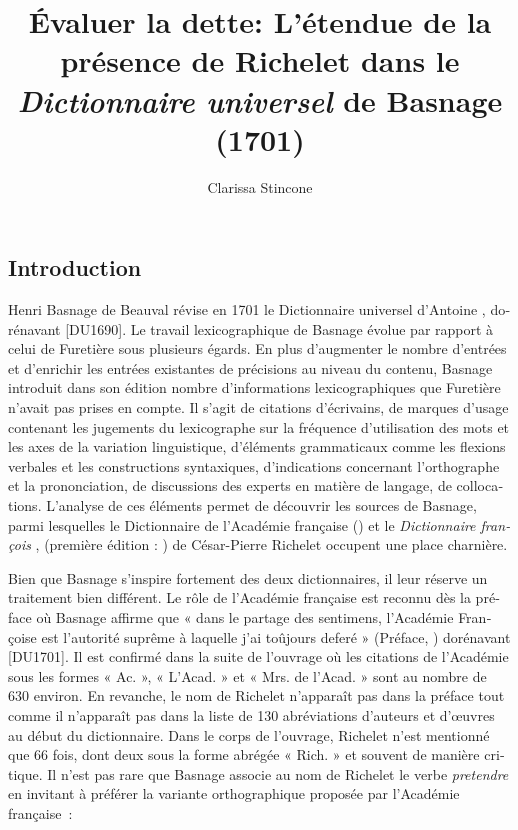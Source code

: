 \documentclass[output=paper,colorlinks,citecolor=brown,arabicfont,chinesefont,booklanguage=french]{langscibook}
\author{Clarissa Stincone\affiliation{Université Sorbonne Nouvelle – Paris 3}}
\title[Richelet dans le Dictionnaire universel de Basnage 1701]
      {Évaluer la dette: L’étendue de la présence de Richelet dans le \textit{Dictionnaire universel} de Basnage (1701)}
\begin{document}
 
\begin{otherlanguage}{french}
\maketitle

\section{Introduction}

Henri Basnage de Beauval révise en 1701 le Dictionnaire universel d’Antoine \citet{Furetière1690}, dorénavant [DU1690]. Le travail lexicographique de Basnage évolue par rapport à celui de Furetière sous plusieurs égards. En plus d’augmenter le nombre d’entrées et d’enrichir les entrées existantes de précisions au niveau du contenu, Basnage introduit dans son édition nombre d’informations lexicographiques que Furetière n’avait pas prises en compte. Il s’agit de citations d’écrivains, de marques d’usage contenant les jugements du lexicographe sur la fréquence d’utilisation des mots et les axes de la variation linguistique, d’éléments grammaticaux comme les flexions verbales et les constructions syntaxiques, d’indications concernant l’orthographe et la prononciation, de discussions des experts en matière de langage, de collocations. L’analyse de ces éléments permet de découvrir les sources de Basnage, parmi lesquelles le Dictionnaire de l’Académie française (\citealt{AcadFr1694}) et le \emph{Dictionnaire françois} \citep{Richelet1693}, (première édition : \citealt{Richelet1680}) de César-Pierre Richelet occupent une place charnière. 

Bien que Basnage s'inspire fortement des deux dictionnaires, il leur réserve un traitement bien différent. Le rôle de l'Académie française est reconnu dès la préface où Basnage affirme que « dans le partage des sentimens, l’Académie Françoise est l’autorité suprême à laquelle j’ai toûjours deferé » (Préface, \citealt{Furetiere1701}) dorénavant [DU1701]. Il est confirmé dans la suite de l'ouvrage où les citations de l'Académie sous les formes « Ac. », « L'Acad. » et « Mrs. de l'Acad. » sont au nombre de 630 environ. En revanche, le nom de Richelet n'apparaît pas dans la préface tout comme il n'apparaît pas dans la liste de 130 abréviations d'auteurs et d'œuvres au début du dictionnaire. Dans le corps de l'ouvrage, Richelet n'est mentionné que 66 fois, dont deux sous la forme abrégée « Rich. » et souvent de manière critique. Il n'est pas rare que Basnage associe au nom de Richelet le verbe \textit{pretendre} en invitant à préférer la variante orthographique proposée par l’Académie française~: 


\end{otherlanguage}
\end{document}
